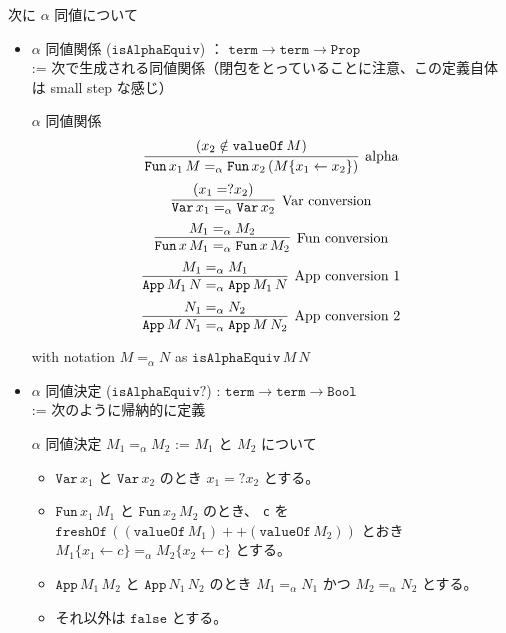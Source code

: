 \documentclass[dvipdfmx]{jsarticle}
\begin{document}
次に \(\alpha\) 同値について
\begin{itemize}
  \item \(\alpha\) 同値関係 (\(\texttt{isAlphaEquiv}\)) ： \(\texttt{term} \to \texttt{term} \to \texttt{Prop}\) \\
    := 次で生成される同値関係（閉包をとっていることに注意、この定義自体は small step な感じ）
    \begin{itembox}[l]{\(\alpha\) 同値関係}
      \[\infer[\text{alpha}]{\texttt{Fun} \, x_1 \, M =_{\alpha} \texttt{Fun} \, x_2 \, (M\{x_1 \leftarrow x_2\})}{(x_2 \notin \texttt{valueOf} \, M)}\]
      \[\infer[\text{Var conversion}]{\texttt{Var} \, x_1 =_{\alpha} \texttt{Var} \, x_2}{(x_1 =? x_2)}\]
      \[\infer[\text{Fun conversion}]{\texttt{Fun} \, x \, M_1 =_{\alpha} \texttt{Fun} \, x \, M_2}{M_1 =_{\alpha} M_2}\]
      \[\infer[\text{App conversion 1}]{\texttt{App} \, M_1 \, N =_{\alpha} \texttt{App} \, M_1 \, N}{M_1 =_{\alpha} M_1}\]
      \[\infer[\text{App conversion 2}]{\texttt{App} \, M \, N_1 =_{\alpha} \texttt{App} \, M \, N_2}{N_1 =_{\alpha} N_2}\]
    \end{itembox}
    with notation \(M =_{\alpha} N\) as \(\texttt{isAlphaEquiv} \, M \, N\)
  \item \(\alpha\) 同値決定 (\(\texttt{isAlphaEquiv?}\)) : \(\texttt{term} \to \texttt{term} \to \texttt{Bool}\) \\
    := 次のように帰納的に定義 \\
      \begin{itembox}[l]{\(\alpha\) 同値決定}
        \(M_1 =_{\alpha} M_2\) := \(M_1\) と \(M_2\) について
        \begin{itemize}
          \item \(\texttt{Var} \, x_1\) と \(\texttt{Var} \, x_2\) のとき \(x_1 =? x_2\) とする。
          \item \(\texttt{Fun} \, x_1 \, M_1\) と \(\texttt{Fun} \, x_2 \, M_2\) のとき、
          \texttt{c} を \(\texttt{freshOf} \, ((\texttt{valueOf} \, M_1) ++ (\texttt{valueOf} \, M_2))\) とおき \\
          \(M_1 \{x_1 \leftarrow c\} =_{\alpha} M_2 \{x_2 \leftarrow c\}\) とする。
          \item \(\texttt{App} \, M_1 \, M_2\) と \(\texttt{App} \, N_1 \, N_2\) のとき
          \(M_1 =_{\alpha} N_1\) かつ \(M_2 =_{\alpha} N_2\) とする。
          \item それ以外は \(\texttt{false}\) とする。
        \end{itemize}
      \end{itembox}

\end{itemize}
\end{document}
